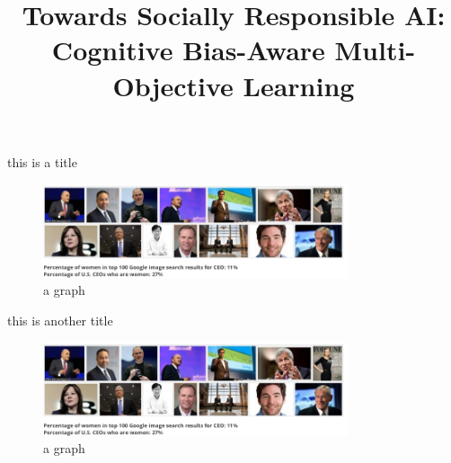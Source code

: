 \documentclass{beamer}%
\title{Towards Socially Responsible AI: Cognitive Bias{-}Aware Multi{-}Objective Learning\newline%
}%
\begin{document}
%
\normalsize%
\maketitle%
this is a title%


\begin{figure}[h!]%
\centering%
\includegraphics[width=0.8\textwidth]{ceo.png}%
\caption{a graph}%
\end{figure}

%
this is another title%


\begin{figure}%
\centering%
\includegraphics[width=0.8\textwidth]{ceo.png}%
\caption{a graph}%
\end{figure}

%
\end{document}
